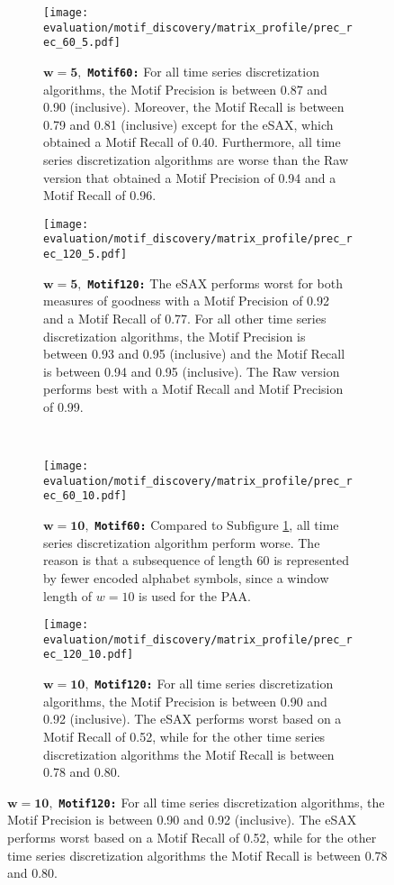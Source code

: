 \begin{figure}[H]
\centering
\begin{subfigure}[t]{0.45\textwidth}
\texttt{[image: evaluation/motif\_discovery/matrix\_profile/prec\_rec\_60\_5.pdf]}
\caption{$\mathbf{w = 5},$ \texttt{\textbf{Motif60:}} For all time series discretization algorithms, the Motif Precision is between 0.87 and 0.90 (inclusive). Moreover, the Motif Recall is between 0.79 and 0.81 (inclusive) except for the \ac{eSAX}, which obtained a Motif Recall of 0.40. Furthermore, all time series discretization algorithms are worse than the Raw version that obtained a Motif Precision of 0.94 and a Motif Recall of 0.96.}
\label{fig:mp_60_5}
\end{subfigure}
\hfill%
\begin{subfigure}[t]{0.45\textwidth}
\texttt{[image: evaluation/motif\_discovery/matrix\_profile/prec\_rec\_120\_5.pdf]}
\caption{$\mathbf{w = 5},$ \texttt{\textbf{Motif120:}} The \ac{eSAX} performs worst for both measures of goodness with a Motif Precision of 0.92 and a Motif Recall of 0.77. For all other time series discretization algorithms, the Motif Precision is between 0.93 and 0.95 (inclusive) and the Motif Recall is between 0.94 and 0.95 (inclusive). The Raw version performs best with a Motif Recall and Motif Precision of 0.99.}
\label{fig:mp_120_5}
\end{subfigure}
\\[10pt]
\begin{subfigure}[t]{0.45\textwidth}
\texttt{[image: evaluation/motif\_discovery/matrix\_profile/prec\_rec\_60\_10.pdf]}
\caption{$\mathbf{w = 10},$ \texttt{\textbf{Motif60:}} Compared to Subfigure \ref{fig:mp_60_5}, all time series discretization algorithm perform worse. The reason is that a subsequence of length 60 is represented by fewer encoded alphabet symbols, since a window length of $w = 10$ is used for the \ac{PAA}.}
\label{fig:mp_60_10}
\end{subfigure}
\hfill%
\begin{subfigure}[t]{0.45\textwidth}
\texttt{[image: evaluation/motif\_discovery/matrix\_profile/prec\_rec\_120\_10.pdf]}
\caption{$\mathbf{w = 10},$ \texttt{\textbf{Motif120:}} For all time series discretization algorithms, the Motif Precision is between 0.90 and 0.92 (inclusive). The \ac{eSAX} performs worst based on a Motif Recall of 0.52, while for the other time series discretization algorithms the Motif Recall is between 0.78 and 0.80.}
\label{fig:mp_120_10}
\end{subfigure}

\end{figure}
